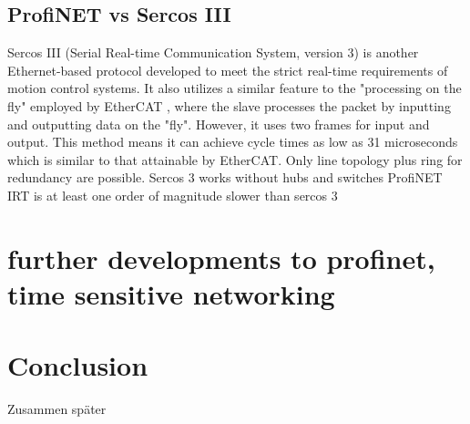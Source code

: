 \documentclass[conference]{IEEEtran}
\begin{document}
\subsection{ProfiNET vs Sercos III}
Sercos III (Serial Real-time Communication System, version 3) is another Ethernet-based protocol developed to meet the strict real-time requirements of motion control systems. It also utilizes a similar feature to the "processing on the fly" employed by EtherCAT , where the slave processes the packet by inputting and outputting data on the "fly". However, it uses two frames for input and output. This method means it can achieve cycle times as low as 31 microseconds which is similar to that attainable by EtherCAT.
Only line topology plus ring for redundancy are possible. Sercos 3 works without hubs and switches
ProfiNET IRT is at least one order of magnitude slower than sercos 3

\section{further developments to profinet, time sensitive networking}
\section{Conclusion}

Zusammen später

\printbibliography
\end{document}
